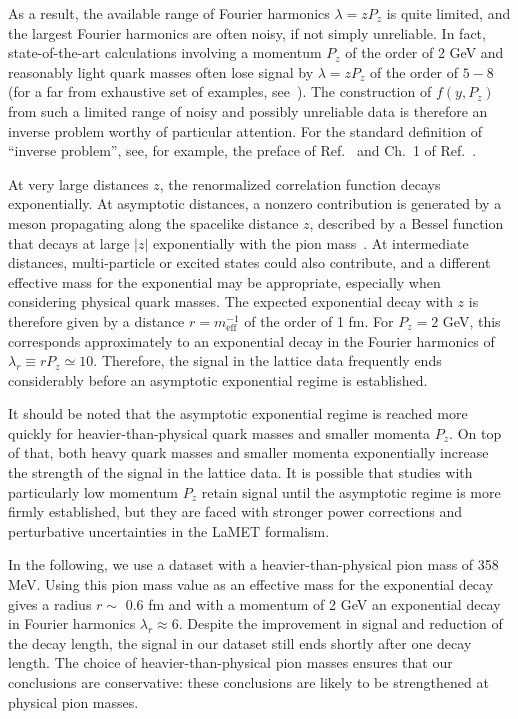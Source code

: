 \documentclass[aps,prl,groupedaddress,twocolumn,superscriptaddress,amsfonts,amssymb,amsmath,showpacs,floatfix,preprintnumbers]{revtex4-2}
\begin{document}
As a result, the available range of Fourier harmonics $\lambda = z P_z$ is quite limited, and the largest Fourier harmonics are often noisy, if not simply unreliable. In fact, state-of-the-art calculations involving a momentum $P_z$ of the order of 2 GeV and reasonably light quark masses often lose signal by $\lambda = z P_z$ of the order of $5 - 8$ (for a far from exhaustive set of examples, see~\cite{Zhang:2020dkn,Alexandrou:2021oih,Gao:2021dbh,HadStruc:2021qdf,Fan:2022kcb,Gao:2023ktu,Delmar:2023agv, Ding:2024saz,Good:2024iur}). The construction of $f(y, P_z)$ from such a limited range of noisy and possibly unreliable data is therefore an inverse problem worthy of particular attention. For the standard definition of ``inverse problem'', see, for example, the preface of Ref.~\cite{doi:10.1137/1.9780898717921} and Ch.~1 of Ref.~\cite{Aster2013}.

At very large distances $z$, the renormalized correlation function decays exponentially. At asymptotic distances, a nonzero contribution is generated by a meson propagating along the spacelike distance $z$, described by a Bessel function that decays at large $|z|$ exponentially with the pion mass~\cite{Gao:2021dbh}. At intermediate distances, multi-particle or excited states could also contribute, and a different effective mass for the exponential may be appropriate, especially when considering physical quark masses. The expected exponential decay with $z$ is therefore given by a distance $r = m_{\textrm{eff}}^{-1}$ of the order of 1 fm. For $P_z = 2$ GeV, this corresponds approximately to an exponential decay in the Fourier harmonics of $\lambda_r \equiv r P_z \simeq 10$. Therefore, the signal in the lattice data frequently ends considerably before an asymptotic exponential regime is established.

It should be noted that the asymptotic exponential regime is reached more quickly for heavier-than-physical quark masses and smaller momenta $P_z$. On top of that, both heavy quark masses and smaller momenta
exponentially increase the strength of the signal in the lattice data. It is possible that studies with particularly low momentum $P_z$ retain signal until the asymptotic regime is more firmly established, but they are faced with stronger power corrections and perturbative uncertainties in the LaMET formalism.

In the following, we use a dataset with a heavier-than-physical pion mass of 358 MeV. Using this pion mass value as an effective mass for the exponential decay gives a radius $r\sim$ 0.6 fm and with a momentum of 2 GeV an exponential decay in Fourier harmonics $\lambda_r \approx 6$. Despite the improvement in signal and reduction of the decay length, the signal in our dataset still ends shortly after one decay length. The choice of heavier-than-physical pion masses ensures that our conclusions are conservative: these conclusions are likely to be strengthened at physical pion masses.
\end{document}
